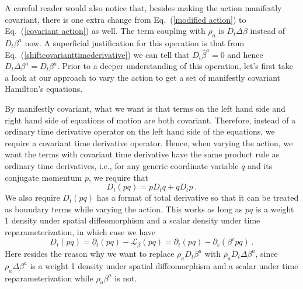 A careful reader would also notice that, besides making the action manifestly covariant, there is one extra change from Eq.~(\ref{modified action}) to Eq.~(\ref{covariant action}) as well. The term coupling with $\rho_{a}$ is $D_{t}\Delta \beta$ instead of $D_{t}\beta^{a}$ now. A superficial justification for this operation is that from Eq.~(\ref{shiftcovarianttimederivative}) we can tell that $D_{t}{\bar \beta}^{a} = 0$ and hence $D_{t}\Delta \beta^{a} = D_{t}\beta^{a}$. Prior to a deeper understanding of this operation, let's first take a look at our approach to vary the action to get a set of manifestly covariant Hamilton's equations. 

By manifestly covariant, what we want is that terms on the left hand side and right hand side of equations of motion are both covariant. Therefore, instead of a ordinary time derivative operator on the left hand side of the equations, we require a covariant time derivative operator. Hence, when varying the action, we want the terms with covariant time derivative have the same product rule as ordinary time derivatives, i.e., for any generic coordinate variable $q$ and its conjugate momentum $p$, we require that
\begin{equation}\label{productrule}
D_{t}( pq ) = pD_{t}q + qD_{t}p \ .
\end{equation}
We also require $D_{t}(pq)$ has a format of total derivative so that it can be treated as boundary terms while varying the action. This works as long as $pq$ is a weight 1 density under spatial diffeomorphism and a scalar density under time reparameterization, in which case we have
\begin{equation}
D_{t}(pq) = \partial_{t}(pq) - \mathcal{L}_{\beta}(pq) = \partial_{t}(pq) - \partial_{c}\left(\beta^{c}pq\right) \ .
\end{equation}
Here resides the reason why we want to replace $\rho_{a}D_{t}\beta^{a}$ with $\rho_{a}D_{t}\Delta \beta^{a}$, since $\rho_{a}\Delta \beta^{a}$ is a weight 1 density under spatial diffeomorphism and a scalar under time reparameterization while $\rho_{a}\beta^{a}$ is not. 

